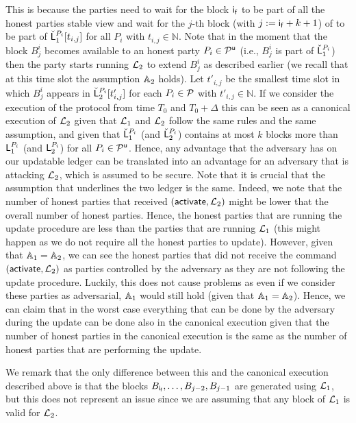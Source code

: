 This is because the parties need to wait for the block $\mathsf{i_f}$ to be part of all the honest parties stable view
and wait for the $j$-th block (with $j:=\mathsf{i_f}+k+1$) of to be part of $\check {\mathsf{L}}_1^{P_i}[t_{i,j}]$  for all $P_i$ with $t_{i,j}\in\mathbb{N}$. 
Note that in the moment that the block $B^i_{j}$ becomes available to an honest party $P_i\in\mathcal{P}^\mathsf{u}$ (i.e., $B^i_{j}$ is part of $\check {\mathsf{L}}_1^{P_i}$) then the party starts running $\mathcal{L}_2$ to extend $B^i_{j}$ as described earlier (we recall that at this time slot the assumption $\mathbb{A}_2$ holds).
Let $t'_{i,j}$ be the smallest time slot in which $B^i_{j}$ appears in $\check {\mathsf{L}}_2^{P_i}[t'_{i,j}]$
 for each $P_i\in\mathcal{P}$ with $t'_{i,j}\in\mathbb{N}$. 
If we consider the execution of the protocol from time $T_0$ and $T_0+\Delta$ this can be seen as a canonical execution of $\mathcal{L}_2$ given that $\mathcal{L}_1$ and $\mathcal{L}_2$ follow the same rules 
and the same assumption, and given that $\check {\mathsf{L}}_1^{P_i}$ (and $\check {\mathsf{L}}_2^{P_i}$) contains at most $k$ blocks 
more than $\mathsf{L}_1^{P_i}$ (and $\mathsf{L}_2^{P_i}$) for all $P_i\in\mathcal{P}^\mathsf{u}$. Hence, any advantage that the adversary has on our updatable ledger can be translated into an advantage for an adversary that is attacking $\mathcal{L}_2$, which is assumed to be secure.
Note that it is crucial that the assumption that underlines the two ledger is the same. Indeed, we note that the
number of honest parties that received $(\mathsf{activate}, \mathcal{L}_2)$ might be lower that the overall number of honest parties. Hence, the honest parties that are running the update procedure are less than the parties that are running $\mathcal{L}_1$ (this might happen as we do not require all the honest parties to update). However, given that 
$\mathbb{A}_1=\mathbb{A}_2$, we can see the honest parties that did not receive the command $(\mathsf{activate},\mathcal{L}_2)$
as parties controlled by the adversary as they are not following the update procedure. Luckily, this does not
cause problems as even if we consider these parties as adversarial, $\mathbb{A}_1$ would still hold  
(given that $\mathbb{A}_1=\mathbb{A}_2$). Hence, we can claim that in the worst case everything that can be done by the adversary during the update can be done also in the canonical execution given that the number of honest parties
in the canonical execution is the same as the number of honest parties that are performing the update.

We remark that the only difference between this and the canonical execution described above is
that the blocks $B_{\mathsf{i_f}},\dots, B_{j-2}, B_{j-1}$  are generated using $\mathcal{L}_1$, but this does not represent an issue since we are assuming that any block of $\mathcal{L}_1$ is valid for $\mathcal{L}_2$.